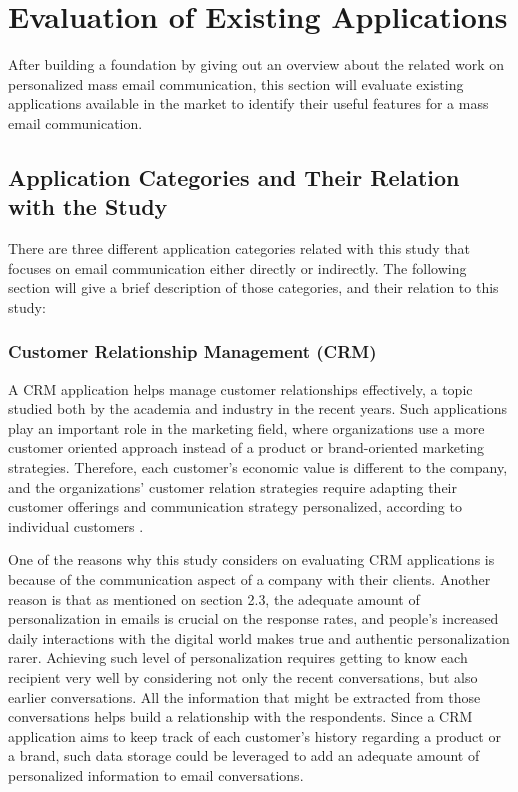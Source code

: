 \chapter{Evaluation of Existing Applications}
\label{chp:3:EvalExisAppl}
After building a foundation by giving out an overview about the related work on personalized mass email communication, this section will evaluate existing applications available in the market to identify their useful features for a mass email communication.

\section{Application Categories and Their Relation with the Study}
\label{sec:3.1:SystCate}

There are three different application categories related with this study that focuses on email communication either directly or indirectly. The following section will give a brief description of those categories, and their relation to this study:

\subsection{Customer Relationship Management (CRM)}
\label{subsec:3.1.1:Cust}
A \ac{CRM} application helps manage customer relationships effectively, a topic studied both by the academia and industry in the recent years. Such applications play an important role in the marketing field, where organizations use a more customer oriented approach instead of a product or brand-oriented marketing strategies. Therefore, each customer's economic value is different to the company, and the organizations' customer relation strategies require adapting their customer offerings and communication strategy personalized, according to individual customers \citep{Reinartz2004}. 
\vspace{1cm}

One of the reasons why this study considers on evaluating \ac{CRM} applications is because of the communication aspect of a company with their clients. Another reason is that as mentioned on section 2.3, the adequate amount of personalization in emails is crucial on the response rates, and people's increased daily interactions with the digital world makes true and authentic personalization rarer. Achieving such level of personalization requires getting to know each recipient very well by considering not only the recent conversations, but also earlier conversations. All the information that might be extracted from those conversations helps build a relationship with the respondents. Since a \ac{CRM} application aims to keep track of each customer's history regarding a product or a brand, such data storage could be leveraged to add an adequate amount of personalized information to email conversations. 

